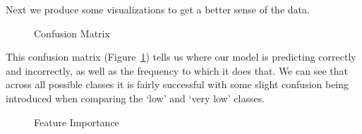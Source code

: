 \documentclass[
  letterpaper,
  DIV=11,
  numbers=noendperiod]{scrartcl}
\begin{document}
Next we produce some visualizations to get a better sense of the data.

\begin{figure}


\caption{\label{fig-confusion_matrix}Confusion Matrix}

\end{figure}%

This confusion matrix (Figure~\ref{fig-confusion_matrix}) tells us where
our model is predicting correctly and incorrectly, as well as the
frequency to which it does that. We can see that across all possible
classes it is fairly successful with some slight confusion being
introduced when comparing the `low' and `very low' classes.

\begin{figure}


\caption{\label{fig-feature_inportance}Feature Importance}

\end{figure}%
\end{document}
